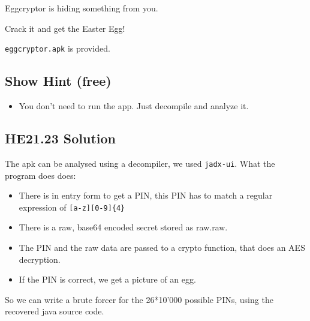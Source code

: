\documentclass[english,a4paper,nols,noindent]{tufte-handout}
\begin{document}
\noindent Eggcryptor is hiding something from you.

Crack it and get the Easter Egg!

\verb+eggcryptor.apk+ is provided.
\subsection{Show Hint (free)}
\begin{itemize}
\item You don't need to run the app. Just decompile and analyze it.
\end{itemize}


\hypertarget{he21.23-solution}{%
\subsection{HE21.23 Solution}\label{he21.23-solution}}

\noindent The apk can be analysed using a decompiler, we used \verb+jadx-ui+.
What the program does does:

\begin{itemize} 

    \item There is in entry form to get a PIN, this PIN has to match a regular
        expression of \verb+[a-z][0-9]{4}+

    \item There is a raw, base64 encoded secret stored as raw.raw.

    \item The PIN and the raw data are passed to a crypto function, that does
        an AES decryption.

    \item If the PIN is correct, we get a picture of an egg.
\end{itemize}

So we can write a brute forcer for the 26*10'000 possible PINs, using the recovered java source code.
\end{document}
